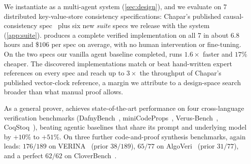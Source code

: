 
We instantiate \sys as a multi-agent system (\cref{sec:design}), and we evaluate \sys{} on 7 distributed key-value-store consistency specifications: Chapar's published causal-consistency spec~\cite{chapar} plus six new \emph{\sys{} suite} specs we release with the system (\cref{app:suite}). \sys{} produces a complete verified implementation on all 7 in about $6.8$ hours and \$$106$ per spec on average, with no human intervention or fine-tuning. On the two specs our vanilla agent baseline completed, \sys{} runs $1.6\times$ faster and $17\%$ cheaper. The discovered implementations match or beat hand-written expert references on every spec and reach up to $3\times$ the throughput of Chapar's published vector-clock reference, a margin we attribute to a design-space search broader than what manual proof allows.

As a general prover, \sys{} achieves state-of-the-art performance on four cross-language verification benchmarks (DafnyBench~\cite{dafnybench}, miniCodeProps~\cite{minicodeprops}, Verus-Bench~\cite{autoverus}, CoqStoq~\cite{rango}), beating agentic baselines that share its prompt and underlying model by $+10\%$ to $+51\%$. On three further code-and-proof synthesis benchmarks, \sys{} again leads: $176/189$ on VERINA~\cite{verina} (prior $38/189$), $65/77$ on AlgoVeri~\cite{algoveri} (prior $31/77$), and a perfect $62/62$ on CloverBench~\cite{clover}.

